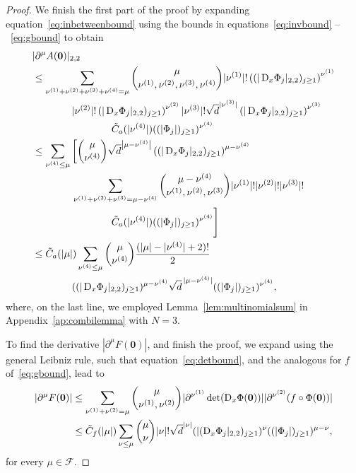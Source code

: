 \begin{proof}
    We finish the first part of the proof by expanding equation~\eqref{eq:inbetweenbound} using the bounds in equations~\eqref{eq:invbound} --~\eqref{eq:gbound} to obtain
    \begin{align*}
        &|\partial^\mu{A}(\bm{0})|_{2,2}\nonumber\\
        &\leq \sum_{\nu^{(1)}+\nu^{(2)}+\nu^{(3)}+\nu^{(4)}=\mu} \binom{\mu}{ \nu^{(1)},\nu^{(2)},\nu^{(3)}, {\nu^{(4)}}}
        |\nu^{(1)}|!\left( (|\mathop{}\!\mathrm{D}_x \Phi_j |_{2,2})_{j \geq 1} \right)^{\nu^{(1)}}\nonumber\\
        & \qquad \qquad    |\nu^{(2)}|!\left( |\mathop{}\!\mathrm{D}_x \Phi_j |_{2,2})_{j \geq 1} \right)^{\nu^{(2)}}  |\nu^{(3)}|!\sqrt{d}^{|\nu^{(3)}|}\left( |\mathop{}\!\mathrm{D}_x \Phi_j |_{2,2})_{j \geq 1} \right)^{\nu^{(3)}}\nonumber\\
        &\qquad\qquad\qquad \qquad  {\tilde{C}_a}(|{\nu^{(4)}}|)((|\Phi_j|)_{j \geq 1})^{{\nu^{(4)}}} \nonumber \\
        &\leq  \sum_{{\nu^{(4)}} \leq \mu} \left[ \binom{\mu }{ {\nu^{(4)}}} \sqrt{d}^{\left|\mu - {\nu^{(4)}}\right|} \left(( |\mathop{}\!\mathrm{D}_x \Phi_j |_{2,2})_{j\geq 1} \right)^{\mu - {\nu^{(4)}}}\right. \\
        &\qquad\qquad   \sum_{\nu^{(1)}+\nu^{(2)}+\nu^{(3)}=\mu-{\nu^{(4)}}} \binom{\mu - {\nu^{(4)}} }{ \nu^{(1)},\nu^{(2)},\nu^{(3)}} |\nu^{(1)}|! |\nu^{(2)}|! |\nu^{(3)}|!  \nonumber\\
        &\qquad\qquad\qquad\qquad{\tilde{C}_a}(|{\nu^{(4)}}|) ((|\Phi_j|)_{j \geq 1})^{{\nu^{(4)}}}\Bigg]  \nonumber \\
        &\leq  {\tilde{C}_a}(|\mu|)  \sum_{ {\nu^{(4)}} \leq \mu} \binom{\mu}{{\nu^{(4)}}} \frac{(|\mu| - |{\nu^{(4)}}| + 2)!}{2} \nonumber\\
        & \qquad\qquad((|\mathop{}\!\mathrm{D}_x \Phi_j|_{2,2} )_{j \geq 1})^{\mu - {\nu^{(4)}}} \sqrt{d}^{\,|\mu - {\nu^{(4)}}|} ((| \Phi_j| )_{j \geq 1})^{ {\nu^{(4)}}},
    \end{align*}
    where, on the last line, we employed Lemma~\ref{lem:multinomialsum} in Appendix~\ref{ap:combilemma} with $N=3$.

    To find the derivative $\left|\partial^\mu F(\bm{0}) \right|$, and finish the proof, we expand using the general Leibniz rule, such that equation~\eqref{eq:detbound}, and the analogous for $f$ of~\eqref{eq:gbound}, lead to
    \begin{align*}
        \left|\partial^\mu F(\bm{0}) \right| &\leq \sum_{{\nu^{(1)}} + {\nu^{(2)}} = \mu} \binom{\mu }{ {\nu^{(1)}}, {\nu^{(2)}}} | \partial^{\nu^{(1)}} \det(\mathop{}\!\mathrm{D}_x\Phi(\bm{0})) |  | \partial^{\nu^{(2)}} (f \circ \Phi(\bm{0})) |\\
        &\leq {\tilde{C}_f}(|\mu|)   \sum_{\nu \leq\mu} \binom{\mu }{ \nu} |\nu|!\sqrt{d}^{|\nu|}(|(\mathop{}\!\mathrm{D}_x \Phi_j|_{2,2})_{j \geq 1})^\nu ((|\Phi_j|)_{j \geq 1})^{\mu-\nu},
    \end{align*}
    for every $\mu\in\mathcal{F}$.
\end{proof}

